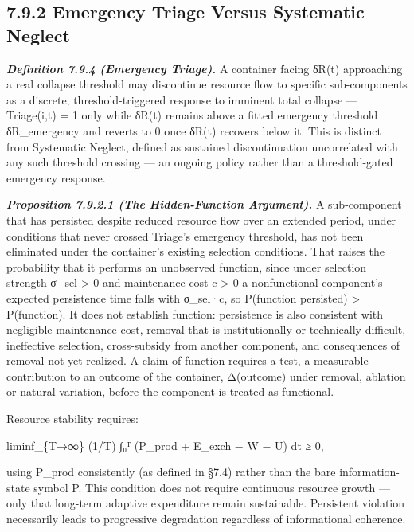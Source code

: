 \documentclass[
]{article}
\begin{document}
\hypertarget{emergency-triage-versus-systematic-neglect}{%
\subsection{7.9.2 Emergency Triage Versus Systematic
Neglect}\label{emergency-triage-versus-systematic-neglect}}

\emph{\textbf{Definition 7.9.4 (Emergency Triage).}} A container facing
δR(t) approaching a real collapse threshold may discontinue resource
flow to specific sub-components as a discrete, threshold-triggered
response to imminent total collapse --- Triage(i,t) = 1 only while δR(t)
remains above a fitted emergency threshold δR\_emergency and reverts to
0 once δR(t) recovers below it. This is distinct from Systematic
Neglect, defined as sustained discontinuation uncorrelated with any such
threshold crossing --- an ongoing policy rather than a threshold-gated
emergency response.

\emph{\textbf{Proposition 7.9.2.1 (The Hidden-Function Argument).}} A
sub-component that has persisted despite reduced resource flow over an
extended period, under conditions that never crossed Triage's emergency
threshold, has not been eliminated under the container's existing
selection conditions. That raises the probability that it performs an
unobserved function, since under selection strength σ\_sel
\textgreater{} 0 and maintenance cost c \textgreater{} 0 a nonfunctional
component's expected persistence time falls with σ\_sel·c, so P(function
\textbar{} persisted) \textgreater{} P(function). It does not establish
function: persistence is also consistent with negligible maintenance
cost, removal that is institutionally or technically difficult,
ineffective selection, cross-subsidy from another component, and
consequences of removal not yet realized. A claim of function requires a
test, a measurable contribution to an outcome of the container,
Δ(outcome) under removal, ablation or natural variation, before the
component is treated as functional.

Resource stability requires:

liminf\_\{T→∞\} (1/T) ∫₀ᵀ (P\_prod + E\_exch − W − U) dt ≥ 0,

using P\_prod consistently (as defined in §7.4) rather than the bare
information-state symbol P. This condition does not require continuous
resource growth --- only that long-term adaptive expenditure remain
sustainable. Persistent violation necessarily leads to progressive
degradation regardless of informational coherence.
\end{document}
